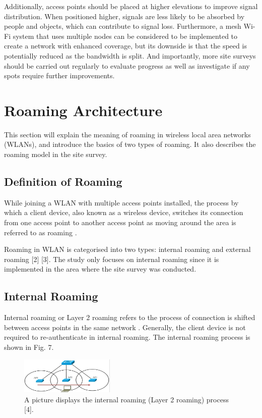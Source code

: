 \documentclass[conference]{IEEEtran}
\begin{document}
Additionally, access points should be placed at higher elevations to improve signal distribution. When positioned higher, signals are less likely to be absorbed by people and objects, which can contribute to signal loss. Furthermore, a mesh Wi-Fi system that uses multiple nodes can be considered to be implemented to create a network with enhanced coverage, but its downside is that the speed is potentially reduced as the bandwidth is split. And importantly, more site surveys should be carried out regularly to evaluate progress as well as investigate if any spots require further improvements.

\section{Roaming Architecture}

This section will explain the meaning of roaming in wireless local area networks (WLANs), and introduce the basics of two types of roaming. It also describes the roaming model in the site survey.

\subsection{Definition of Roaming}
While joining a WLAN with multiple access points installed, the process by which a client device, also known as a wireless device, switches its connection from one access point to another access point as moving around the area is referred to as roaming \cite{article_example}.

Roaming in WLAN is categorised into two types: internal roaming and external roaming [2] [3]. The study only focuses on internal roaming since it is implemented in the area where the site survey was conducted.

\subsection{Internal Roaming}
Internal roaming or Layer 2 roaming refers to the process of connection is shifted between access points in the same network \cite{article_example}. Generally, the client device is not required to re-authenticate in internal roaming. The internal roaming process is shown in Fig. 7.

\begin{figure}[htbp]
    \centering
    \includegraphics[width=0.4\textwidth]{internal_roaming.png}
    \caption{A picture displays the internal roaming (Layer 2 roaming) process
[4].}
\end{figure}
\end{document}
